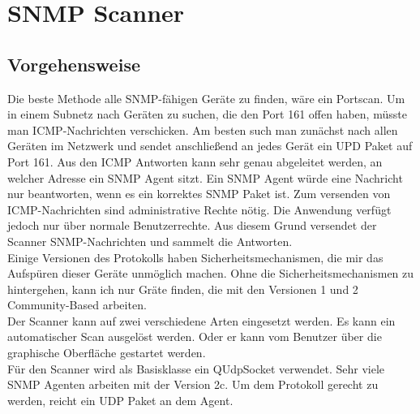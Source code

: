 \documentclass[11pt,a4paper]{article}
\begin{document}
\section{SNMP Scanner}
\subsection{Vorgehensweise}
Die beste Methode alle SNMP-fähigen Geräte zu finden, wäre ein Portscan. Um in einem Subnetz nach Geräten zu suchen, die den Port 161 offen haben, müsste man ICMP-Nachrichten verschicken. Am besten such man zunächst nach allen Geräten im Netzwerk und sendet anschließend an jedes Gerät ein UPD Paket auf Port 161. Aus den ICMP Antworten kann sehr genau abgeleitet werden, an welcher Adresse ein SNMP Agent sitzt. Ein SNMP Agent würde eine Nachricht nur beantworten, wenn es ein korrektes SNMP Paket ist. Zum versenden von ICMP-Nachrichten sind administrative Rechte nötig. Die Anwendung verfügt jedoch nur über normale Benutzerrechte. Aus diesem Grund versendet der Scanner SNMP-Nachrichten und sammelt die Antworten.\\
Einige Versionen des Protokolls haben Sicherheitsmechanismen, die mir das Aufspüren dieser Geräte unmöglich machen. Ohne die Sicherheitsmechanismen zu hintergehen, kann ich nur Gräte finden, die mit den Versionen 1 und 2 Community-Based arbeiten.\\
Der Scanner kann auf zwei verschiedene Arten eingesetzt werden. Es kann ein automatischer Scan ausgelöst werden. Oder er kann vom Benutzer über die graphische Oberfläche gestartet werden.\\
Für den Scanner wird als Basisklasse ein QUdpSocket verwendet. Sehr viele SNMP Agenten arbeiten mit der Version 2c. Um dem Protokoll gerecht zu werden, reicht ein UDP Paket an dem Agent.\\
\end{document}

